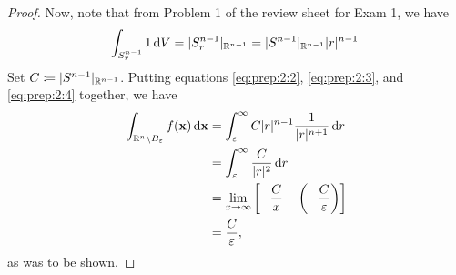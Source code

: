 \begin{proof}
Now, note that from Problem 1 of the review sheet for Exam 1, we have
\begin{equation}
  \label{eq:prep:2:4}
\int_{S_r^{n-1}}1\mathop{}\!\mathrm{d} V=|S_r^{n-1}|_{\mathbb{R}^{n-1}}=|S^{n-1}|_{\mathbb{R}^{n-1}}|r|^{n-1}.
\end{equation}
Set $C\coloneqq|S^{n-1}|_{\mathbb{R}^{n-1}}$. Putting equations
\eqref{eq:prep:2:2}, \eqref{eq:prep:2:3}, and \eqref{eq:prep:2:4} together,
we have
\begin{equation}
\label{eq:prep:2:5}
\begin{aligned}
\int_{\mathbb{R}^n\setminus B_\varepsilon}f(\mathbf{x})\mathop{}\!\mathrm{d}\mathbf{x}
&=\int_\varepsilon^\infty C|r|^{n-1}\frac{1}{|r|^{n+1}}\mathop{}\!\mathrm{d} r\\
&=\int_\varepsilon^\infty\frac{C}{|r|^2}\mathop{}\!\mathrm{d} r\\
&=\lim_{x\to\infty}\left[-\frac{C}{x}-\left(-\frac{C}{\varepsilon}\right)\right]\\
&=\frac{C}{\varepsilon},
\end{aligned}
\end{equation}
as was to be shown.
\end{proof}

